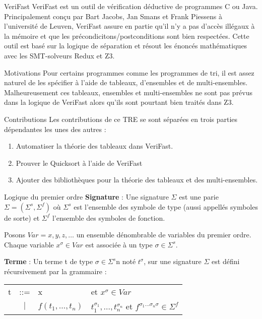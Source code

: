 \documentclass[9pt]{beamer}
\newcommand{\verifast}{VeriFast}
\begin{document}
\begin{frame}{\verifast}
	\verifast{} est un outil de v\'erification d\'eductive de programmes C ou Java. Principalement con\c{c}u par Bart Jacobs, Jan Smans et Frank Piessens \`a l'universit\'e de Leuven, \verifast{} assure en partie qu'il n'y a pas d'acc\`es ill\'egaux \`a la m\'emoire et que les pr\'econdicitons/postconditions sont bien respect\'ees. Cette outil est bas\'e sur la logique de s\'eparation et r\'esout les \'enonc\'es math\'ematiques avec les SMT-solveurs Redux et Z3.
\end{frame}

\begin{frame}{Motivations}
	Pour certains programmes comme les programmes de tri, il est assez naturel de les sp\'ecifier \`a l'aide de tableaux, d'ensembles et de multi-ensembles. Malheureusement ces tableaux, ensembles et multi-ensembles ne sont pas pr\'evus dans la logique de \verifast{} alors qu'ils sont pourtant bien trait\'es dans Z3.
\end{frame}

\begin{frame}{Contributions}
	Les contributions de ce TRE se sont s\'epar\'ees en trois parties d\'ependantes les unes des autres :
	\begin{enumerate}
		\item Automatiser la th\'eorie des tableaux dans \verifast.
		\item Prouver le Quicksort \`a l'aide de \verifast
		\item Ajouter des biblioth\`eques pour la th\'eorie des tableaux et des multi-ensembles.
	\end{enumerate}
\end{frame}

\begin{frame}{Logique du premier ordre}
	\textbf{Signature} : Une signature $\Sigma$ est une parie $\Sigma=(\Sigma^s,\Sigma^f)$ o\`u $\Sigma^s$ est l'ensemble des symbole de type (aussi appell\'es symboles de sorte) et $\Sigma^f$ l'ensemble des symboles de fonction.
	
	Posons $Var = {x,y,z,\ldots}$ un ensemble d\'enombrable de variables du premier ordre. Chaque variable $x^{\sigma} \in Var$ est associ\'ee \`a un type $\sigma \in \Sigma^{s}$.	
	
	\textbf{Terme} : Un terme t de type $\sigma\in\Sigma^s$n not\'e $t^\sigma$, sur une signature $\Sigma$ est d\'efini r\'ecursivement par la grammaire :
	
	\begin{tabular}{lcll}
t & ::= & x & et $x^\sigma\in Var$\\
 & $|$ & $f(t_1,\ldots,t_n)$ & $t_1^{\sigma_1},\ldots,t_n^{\sigma_n}$ et $f^{\sigma_1\ldots\sigma_n\sigma}\in\Sigma^f$

\end{tabular}
\end{frame}
\end{document}
